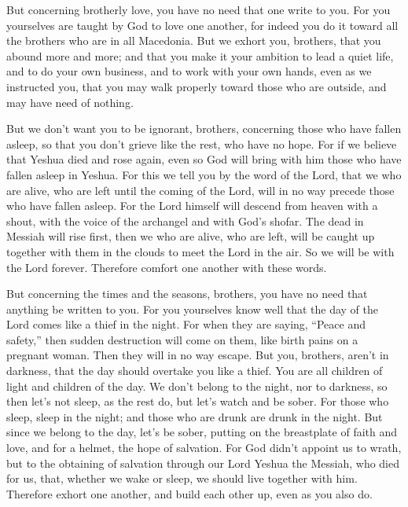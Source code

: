 \myverse{}But concerning brotherly love, you have no need that one write
to you. For you yourselves are taught by God to love one another,
\myverse{}for indeed you do it toward all the brothers who are in all Macedonia. But
we exhort you, brothers, that you abound more and more;
\myverse{}and that you make it your ambition to lead a quiet life, and to do your own
business, and to work with your own hands, even as we instructed you,
\myverse{}that you may walk properly toward those who are outside, and may have need
of nothing.

\myverse{}But we don’t want you to be ignorant, brothers, concerning those
who have fallen asleep, so that you don’t grieve like the rest, who have no hope.
\myverse{}For if we believe that Yeshua died and rose again, even so God will bring
with him those who have fallen asleep in Yeshua.
\myverse{}For this we tell you by the word of the Lord, that we who are alive, who are
left until the coming of the Lord, will in no way precede those who have fallen asleep.
\myverse{}For the Lord himself will descend from heaven with a shout, with the voice
of the archangel and with God’s shofar. The dead in Messiah will rise first,
\myverse{}then we who are alive, who are left, will be caught up together with them
in the clouds to meet the Lord in the air. So we will be with the Lord forever.
\myverse{}Therefore comfort one another with these words.


\mychapter{} \myverse*{}But concerning the times and the seasons, brothers, you have no
need that anything be written to you.
\myverse{}For you yourselves know well that the day of the Lord comes like a thief in
the night.
\myverse{}For when they are saying, “Peace and safety,” then sudden destruction will come
on them, like birth pains on a pregnant woman. Then they will in no way escape.
\myverse{}But you, brothers, aren’t in darkness, that the day should overtake you like
a thief.
\myverse{}You are all children of light and children of the day. We don’t belong to the
night, nor to darkness,
\myverse{}so then let’s not sleep, as the rest do, but let’s watch and be sober.
\myverse{}For those who sleep, sleep in the night; and those who are drunk are drunk in
the night.
\myverse{}But since we belong to the day, let’s be sober, putting on the breastplate of
faith and love, and for a helmet, the hope of salvation.
\myverse{}For God didn’t appoint us to wrath, but to the obtaining of salvation through
our Lord Yeshua the Messiah,
\myverse{}who died for us, that, whether we wake or sleep, we should live together with
him.
\myverse{}Therefore exhort one another, and build each other up, even as you also do.

